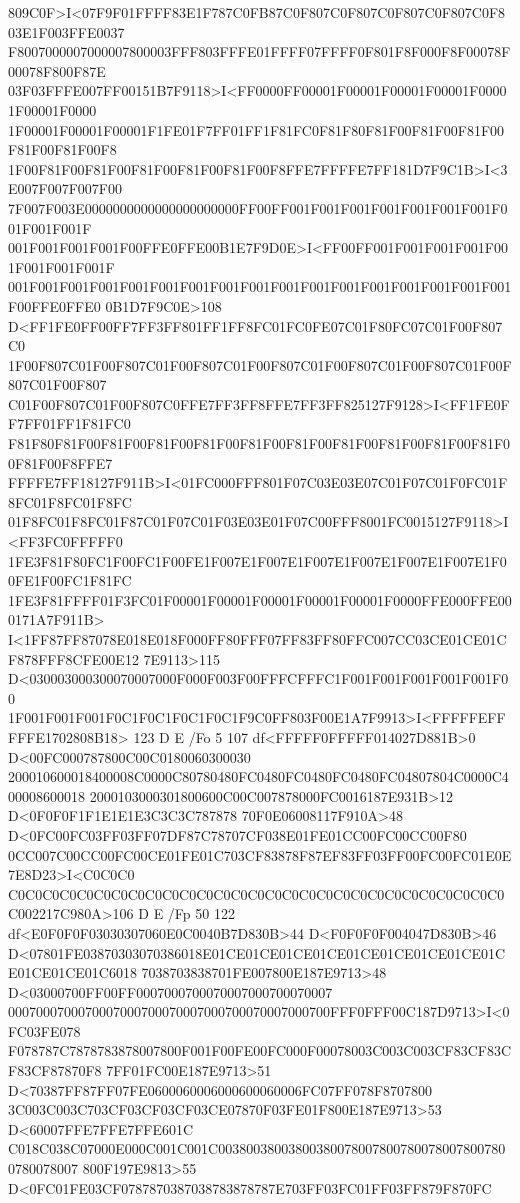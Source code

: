 809C0F>I<07F9F01FFFF83E1F787C0FB87C0F807C0F807C0F807C0F807C0F803E1F003FFE0037
F8007000007000007800003FFF803FFFE01FFFF07FFFF0F801F8F000F8F00078F00078F800F87E
03F03FFFE007FF00151B7F9118>I<FF0000FF00001F00001F00001F00001F00001F00001F0000
1F00001F00001F00001F1FE01F7FF01FF1F81FC0F81F80F81F00F81F00F81F00F81F00F81F00F8
1F00F81F00F81F00F81F00F81F00F81F00F8FFE7FFFFE7FF181D7F9C1B>I<3E007F007F007F00
7F007F003E0000000000000000000000FF00FF001F001F001F001F001F001F001F001F001F001F
001F001F001F001F00FFE0FFE00B1E7F9D0E>I<FF00FF001F001F001F001F001F001F001F001F
001F001F001F001F001F001F001F001F001F001F001F001F001F001F001F001F001F00FFE0FFE0
0B1D7F9C0E>108 D<FF1FE0FF00FF7FF3FF801FF1FF8FC01FC0FE07C01F80FC07C01F00F807C0
1F00F807C01F00F807C01F00F807C01F00F807C01F00F807C01F00F807C01F00F807C01F00F807
C01F00F807C01F00F807C0FFE7FF3FF8FFE7FF3FF825127F9128>I<FF1FE0FF7FF01FF1F81FC0
F81F80F81F00F81F00F81F00F81F00F81F00F81F00F81F00F81F00F81F00F81F00F81F00F8FFE7
FFFFE7FF18127F911B>I<01FC000FFF801F07C03E03E07C01F07C01F0FC01F8FC01F8FC01F8FC
01F8FC01F8FC01F87C01F07C01F03E03E01F07C00FFF8001FC0015127F9118>I<FF3FC0FFFFF0
1FE3F81F80FC1F00FC1F00FE1F007E1F007E1F007E1F007E1F007E1F007E1F00FE1F00FC1F81FC
1FE3F81FFFF01F3FC01F00001F00001F00001F00001F00001F0000FFE000FFE000171A7F911B>
I<1FF87FF87078E018E018F000FF80FFF07FF83FF80FFC007CC03CE01CE01CF878FFF8CFE00E12
7E9113>115 D<030003000300070007000F000F003F00FFFCFFFC1F001F001F001F001F001F00
1F001F001F001F0C1F0C1F0C1F0C1F9C0FF803F00E1A7F9913>I<FFFFFEFFFFFE1702808B18>
123 D E /Fo 5 107 df<FFFFF0FFFFF014027D881B>0 D<00FC000787800C00C0180060300030
200010600018400008C0000C80780480FC0480FC0480FC0480FC04807804C0000C400008600018
2000103000301800600C00C007878000FC0016187E931B>12 D<0F0F0F1F1E1E1E3C3C3C787878
70F0E06008117F910A>48 D<0FC00FC03FF03FF07DF87C78707CF038E01FE01CC00FC00CC00F80
0CC007C00CC00FC00CE01FE01C703CF83878F87EF83FF03FF00FC00FC01E0E7E8D23>I<C0C0C0
C0C0C0C0C0C0C0C0C0C0C0C0C0C0C0C0C0C0C0C0C0C0C0C0C0C0C0C0C0C002217C980A>106
D E /Fp 50 122 df<E0F0F0F03030307060E0C0040B7D830B>44 D<F0F0F0F004047D830B>46
D<07801FE03870303070386018E01CE01CE01CE01CE01CE01CE01CE01CE01CE01CE01CE01C6018
7038703838701FE007800E187E9713>48 D<03000700FF00FF0007000700070007000700070007
0007000700070007000700070007000700070007000700FFF0FFF00C187D9713>I<0FC03FE078
F078787C7878783878007800F001F00FE00FC000F00078003C003C003CF83CF83CF83CF87870F8
7FF01FC00E187E9713>51 D<70387FF87FF07FE0600060006000600060006FC07FF078F8707800
3C003C003C703CF03CF03CF03CE07870F03FE01F800E187E9713>53 D<60007FFE7FFE7FFE601C
C018C038C07000E000C001C001C003800380038003800780078007800780078007800780078007
800F197E9813>55 D<0FC01FE03CF0787870387038783878787E703FF03FC01FF03FF879F870FC
